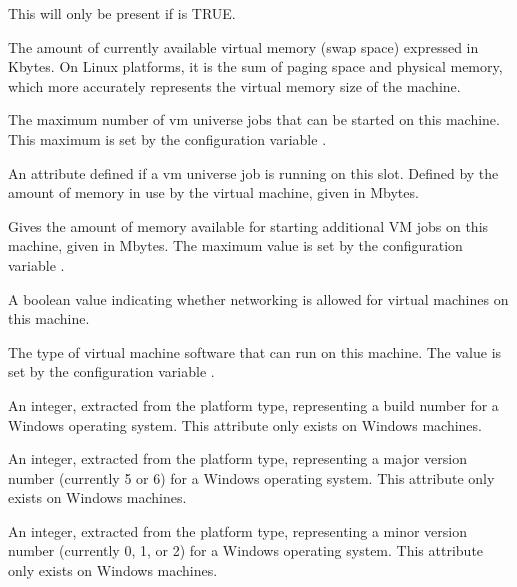 \begin{description}
This will only be present if  is TRUE.
%
\item[\AdAttr{VirtualMemory}:] The amount of currently available virtual memory 
(swap space) expressed in Kbytes.
On Linux platforms, it is the sum of paging space and physical memory, 
which more accurately represents the virtual memory size of the machine. 
%
\item[\AdAttr{VM\_AvailNum}:] The maximum number of vm universe jobs that
can be started on this machine. This maximum is set by the configuration
variable . 
%
\item[\AdAttr{VM\_Guest\_Mem}:] An attribute defined if a vm universe job
is running on this slot.  Defined by the amount of memory in use by the 
virtual machine, given in Mbytes.
%
\item[\AdAttr{VM\_Memory}:] Gives the amount of memory available for starting 
additional VM jobs on this machine, given in Mbytes.
The maximum value is set by the configuration variable .
%
\item[\AdAttr{VM\_Networking}:] A boolean value indicating whether networking 
is allowed for virtual machines on this machine.
%
\item[\AdAttr{VM\_Type}:] The type of virtual machine software that can run
on this machine.  The value is set by the configuration variable
.
%
\item[\AdAttr{WindowsBuildNumber}:] An integer, extracted from the
platform type, representing a build number 
for a Windows operating system.
This attribute only exists on Windows machines.
%
\item[\AdAttr{WindowsMajorVersion}:] An integer, extracted from the
platform type, representing a major version number (currently 5 or 6)
for a Windows operating system.
This attribute only exists on Windows machines.
%
\item[\AdAttr{WindowsMinorVersion}:] An integer, extracted from the
platform type, representing a minor version number (currently 0, 1, or 2)
for a Windows operating system.
This attribute only exists on Windows machines.

\end{description}

